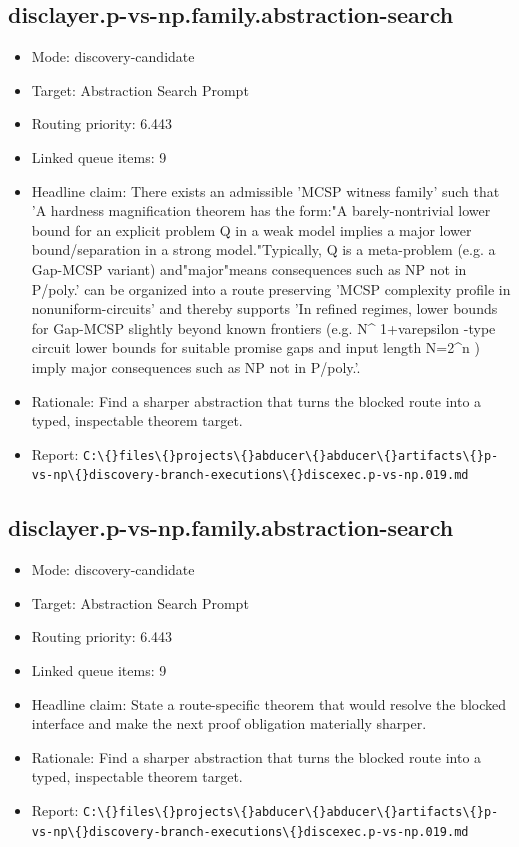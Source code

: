 \documentclass[11pt]{article}
\begin{document}
\subsection*{disclayer.p-vs-np.family.abstraction-search}
\begin{itemize}
\item Mode: discovery-candidate
\item Target: Abstraction Search Prompt
\item Routing priority: 6.443
\item Linked queue items: 9
\item Headline claim: There exists an admissible 'MCSP witness family' such that 'A hardness magnification theorem has the form:"A barely-nontrivial lower bound for an explicit problem Q in a weak model implies a major lower bound/separation in a strong model."Typically, Q is a meta-problem (e.g. a Gap-MCSP variant) and"major"means consequences such as NP not in P/poly.' can be organized into a route preserving 'MCSP complexity profile in nonuniform-circuits' and thereby supports 'In refined regimes, lower bounds for Gap-MCSP slightly beyond known frontiers (e.g. N\textasciicircum{} 1+varepsilon -type circuit lower bounds for suitable promise gaps and input length N=2\textasciicircum{}n ) imply major consequences such as NP not in P/poly.'.
\item Rationale: Find a sharper abstraction that turns the blocked route into a typed, inspectable theorem target.
\item Report: \texttt{C:\textbackslash\{\}files\textbackslash\{\}projects\textbackslash\{\}abducer\textbackslash\{\}abducer\textbackslash\{\}artifacts\textbackslash\{\}p-vs-np\textbackslash\{\}discovery-branch-executions\textbackslash\{\}discexec.p-vs-np.019.md}
\end{itemize}

\subsection*{disclayer.p-vs-np.family.abstraction-search}
\begin{itemize}
\item Mode: discovery-candidate
\item Target: Abstraction Search Prompt
\item Routing priority: 6.443
\item Linked queue items: 9
\item Headline claim: State a route-specific theorem that would resolve the blocked interface and make the next proof obligation materially sharper.
\item Rationale: Find a sharper abstraction that turns the blocked route into a typed, inspectable theorem target.
\item Report: \texttt{C:\textbackslash\{\}files\textbackslash\{\}projects\textbackslash\{\}abducer\textbackslash\{\}abducer\textbackslash\{\}artifacts\textbackslash\{\}p-vs-np\textbackslash\{\}discovery-branch-executions\textbackslash\{\}discexec.p-vs-np.019.md}
\end{itemize}
\end{document}
